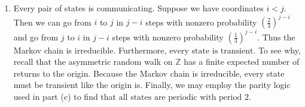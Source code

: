 \documentclass[letterpaper,12pt]{article}
\begin{document}
\begin{flushleft}
\begin{enumerate}[label=(\alph*)]
        \item
        Every pair of states is communicating. Suppose we have coordinates $i < j$. Then we can go from $i$ to $j$ in $j - i$ steps with nonzero probability $\left(\frac{2}{3}\right)^{j - i}$ and go from $j$ to $i$ in $j - i$ steps with nonzero probability $\left(\frac{1}{3}\right)^{j - i}$. Thus the Markov chain is $\boxed{\text{irreducible}}$. Furthermore, $\boxed{\text{every state is transient}}$. To see why, recall that the asymmetric random walk on $\mathbb{Z}$ has a finite expected number of returns to the origin. Because the Markov chain is irreducible, every state must be transient like the origin is. Finally, we may employ the parity logic used in part (c) to find that $\boxed{\text{all states are periodic with period 2}}$.

    \end{enumerate}

\end{flushleft}
\end{document}
